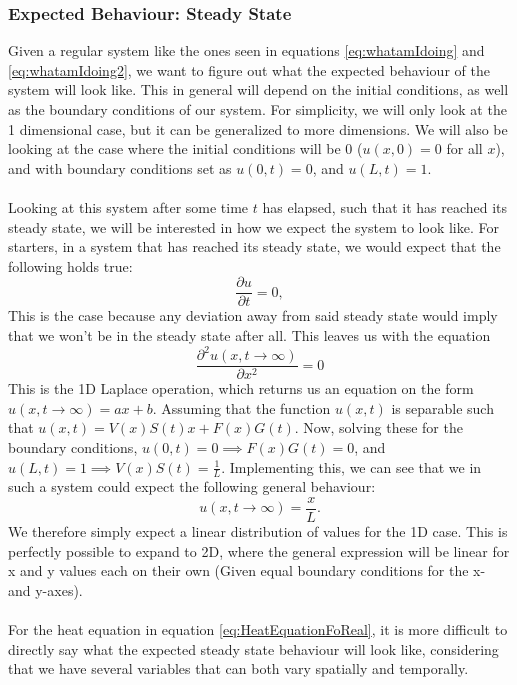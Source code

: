 \documentclass[reprint,english,notitlepage]{revtex4-1}  %
\begin{document}
\subsubsection{Expected Behaviour: Steady State}\label{sec:expect1}

Given a regular system like the ones seen in equations \ref{eq:whatamIdoing} and \ref{eq:whatamIdoing2}, we want to figure out what the expected behaviour of the system will look like. This in general will depend on the initial conditions, as well as the boundary conditions of our system. For simplicity, we will only look at the 1 dimensional case, but it can be generalized to more dimensions. We will also be looking at the case where the initial conditions will be 0 ($u(x,0) = 0$ for all $x$), and with boundary conditions set as $u(0,t) = 0$, and $u(L,t) = 1$.
\\
\\
Looking at this system after some time $t$ has elapsed, such that it has reached its steady state, we will be interested in how we expect the system to look like. For starters, in a system that has reached its steady state, we would expect that the following holds true:
\begin{equation}
    \frac{\partial u}{\partial t} = 0,
\end{equation}
This is the case because any deviation away from said steady state would imply that we won't be in the steady state after all. This leaves us with the equation
\begin{equation}
    \frac{\partial^2 u(x,t\rightarrow\infty)}{\partial x^2} = 0
\end{equation}
This is the 1D Laplace operation, which returns us an equation on the form $u(x,t\rightarrow\infty) = ax+b$. Assuming that the function $u(x,t)$ is separable such that $u(x,t) = V(x)S(t)x + F(x)G(t)$. Now, solving these for the boundary conditions, $u(0,t) = 0 \implies F(x)G(t) = 0$, and $u(L,t) = 1 \implies V(x)S(t) = \frac{1}{L}$. Implementing this, we can see that we in such a system could expect the following general behaviour:
\begin{equation}\label{eq:linearexpectation}
    u(x,t\rightarrow\infty) = \frac{x}{L}.
\end{equation}
We therefore simply expect a linear distribution of values for the 1D case. This is perfectly possible to expand to 2D, where the general expression will be linear for x and y values each on their own (Given equal boundary conditions for the x- and y-axes).
\\
\\
For the heat equation in equation \ref{eq:HeatEquationFoReal}, it is more difficult to directly say what the expected steady state behaviour will look like, considering that we have several variables that can both vary spatially and temporally.
\end{document}
